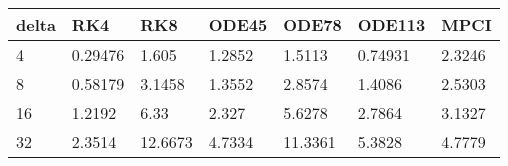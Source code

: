 \begin{tabular}{lllllll}
delta & RK4 & RK8 & ODE45 & ODE78 & ODE113 & MPCI \\ 
\hline 
4 & 0.29476 & 1.605 & 1.2852 & 1.5113 & 0.74931 & 2.3246 \\ 
8 & 0.58179 & 3.1458 & 1.3552 & 2.8574 & 1.4086 & 2.5303 \\ 
16 & 1.2192 & 6.33 & 2.327 & 5.6278 & 2.7864 & 3.1327 \\ 
32 & 2.3514 & 12.6673 & 4.7334 & 11.3361 & 5.3828 & 4.7779 \\ 
\hline 
\end{tabular}